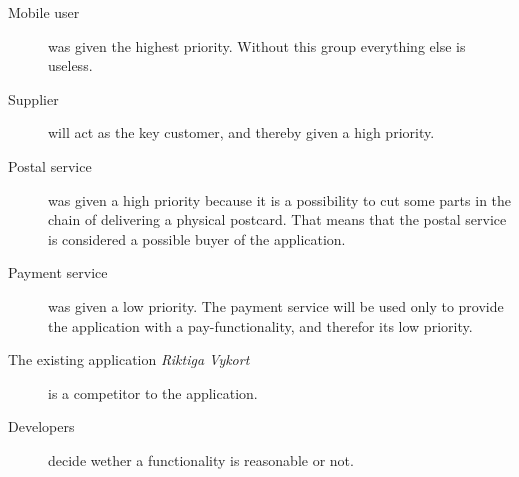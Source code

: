 \documentclass[10pt,a4paper]{article}
\begin{document}
\begin{description}
\item[Mobile user] was given the highest priority. Without this group everything else is useless. 
\item[Supplier] will act as the key customer, and thereby given a high priority. 
\item[Postal service] was given a high priority because it is a possibility to cut some parts in the chain of delivering a physical postcard. That means that the postal service is considered a possible buyer of the application. 
\item[Payment service] was given a low priority. The payment service will be used only to provide the application with a pay-functionality, and therefor its low priority.
\item[The existing application \textit{Riktiga Vykort}]  is a competitor to the application. 
\item[Developers]  decide wether a functionality is reasonable or not.
\end{description}
\end{document}
